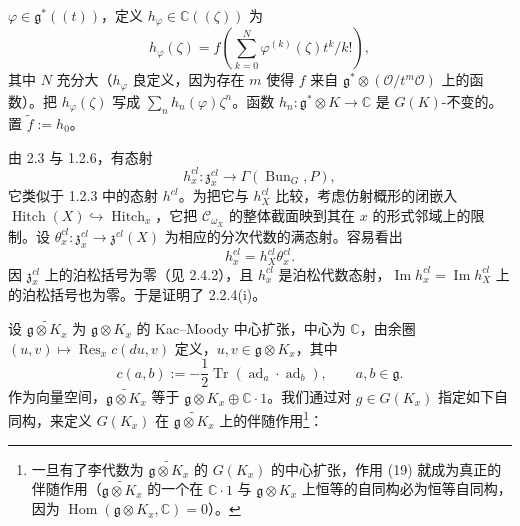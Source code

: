 
$\varphi\in\mathfrak{g}^{*}((t))$，定义 $h_{\varphi}\in\mathbb{C}((\zeta))$ 为
\[
h_{\varphi}(\zeta)=f\left(\sum_{k=0}^{N}\varphi^{(k)}(\zeta)t^{k}/k!\right),
\]
其中 $N$ 充分大（$h_{\varphi}$ 良定义，因为存在 $m$ 使得 $f$ 来自 $\mathfrak{g}^{*}\otimes(\mathcal{O}/t^{m}\mathcal{O})$ 上的函数）。把 $h_{\varphi}(\zeta)$ 写成 $\sum_n h_n(\varphi)\zeta^{n}$。函数 $h_n:\mathfrak{g}^{*}\otimes K\to\mathbb{C}$ 是 $G(K)$-不变的。置 $\tilde{f}:=h_0$。

 由 2.3 与 1.2.6，有态射
\[
h_x^{cl}:\mathfrak{z}_x^{cl}\to\Gamma(\operatorname{Bun}_G,P),
\]
它类似于 1.2.3 中的态射 $h^{cl}$。为把它与 $h_X^{cl}$ 比较，考虑仿射概形的闭嵌入 $\operatorname{Hitch}(X)\hookrightarrow\operatorname{Hitch}_x$，它把 $\mathcal{C}_{\omega_X}$ 的整体截面映到其在 $x$ 的形式邻域上的限制。设 $\theta_x^{cl}:\mathfrak{z}_x^{cl}\to\mathfrak{z}^{cl}(X)$ 为相应的分次代数的满态射。容易看出
\[
h_x^{cl}=h_X^{cl}\theta_x^{cl}.
\]
因 $\mathfrak{z}_x^{cl}$ 上的泊松括号为零（见 2.4.2），且 $h_x^{cl}$ 是泊松代数态射，$\operatorname{Im}h_x^{cl}=\operatorname{Im}h_X^{cl}$ 上的泊松括号也为零。于是证明了 2.2.4(i)。


 设 $\widetilde{\mathfrak{g}\otimes K_x}$ 为 $\mathfrak{g}\otimes K_x$ 的 Kac--Moody 中心扩张，中心为 $\mathbb{C}$，由余圈 $(u,v)\mapsto\operatorname{Res}_x c(du,v)$ 定义，$u,v\in\mathfrak{g}\otimes K_x$，其中
\begin{equation}\tag{18}
c(a,b):=-\frac{1}{2}\operatorname{Tr}(\operatorname{ad}_a\cdot\operatorname{ad}_b),\qquad a,b\in\mathfrak{g}.
\end{equation}
作为向量空间，$\widetilde{\mathfrak{g}\otimes K_x}$ 等于 $\mathfrak{g}\otimes K_x\oplus\mathbb{C}\cdot 1$。我们通过对 $g\in G(K_x)$ 指定如下自同构，来定义 $G(K_x)$ 在 $\widetilde{\mathfrak{g}\otimes K_x}$ 上的伴随作用\footnote{一旦有了李代数为 $\widetilde{\mathfrak{g}\otimes K_x}$ 的 $G(K_x)$ 的中心扩张，作用 (19) 就成为真正的伴随作用（$\widetilde{\mathfrak{g}\otimes K_x}$ 的一个在 $\mathbb{C}\cdot 1$ 与 $\mathfrak{g}\otimes K_x$ 上恒等的自同构必为恒等自同构，因为 $\operatorname{Hom}(\mathfrak{g}\otimes K_x,\mathbb{C})=0$）。}：
